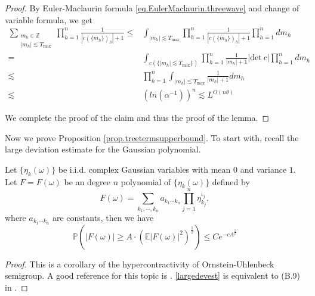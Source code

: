 \begin{proof}
By Euler-Maclaurin formula \eqref{eq.EulerMaclaurin.threewave} and change of variable formula, we get
\begin{equation}
\begin{split}
    \sum_{\substack{m_{h}\in \mathbb{Z}\\ |m_{h}|\lesssim  T_{\text{max}}}} \prod_{h=1}^{n}\frac{1}{|c(\{m_{h}\})_{h}|+1}\le& \int_{|m_{h}|\lesssim  T_{\text{max}}}  \prod_{h=1}^{n}\frac{1}{|c(\{m_{h}\})_{h}|+1}\prod_{h=1}^{n} dm_{h}
    \\
    =& \int_{c(\{|m_{h}|\lesssim  T_{\text{max}}\})}  \prod_{h=1}^{n}\frac{1}{|m_{h}|+1}|\text{det}\ c|\prod_{h=1}^{n}  dm_{h}
    \\
    \lesssim &\prod_{h=1}^{n}\int_{|m_{h}|\lesssim  T_{\text{max}}}  \frac{1}{|m_{h}|+1}  dm_{h}
    \\
    \lesssim & (ln(\alpha^{-1}))^{n}\lesssim L^{O(n\theta)}
\end{split}
\end{equation}

We complete the proof of the claim and thus the proof of the lemma.
\end{proof}

Now we prove Proposition \ref{prop.treetermsupperbound}. To start with, recall the large deviation estimate for the Gaussian polynomial.

\begin{lem}\label{lem.largedev}
Let $\{\eta_k(\omega)\}$ be i.i.d. complex Gaussian variables with mean $0$ and variance $1$. Let $F=F(\omega)$ be an degree $n$ polynomial of $\{\eta_k(\omega)\}$ defined by \begin{equation}\label{indp}
F(\omega)=\sum_{k_1,\cdots,k_n}a_{k_1\cdots k_n}\prod_{j=1}^n\eta_{k_j}^{\iota_j},
\end{equation} 
where $a_{k_1\cdots k_n}$ are constants, then we have 
\begin{equation}\label{largedevest}\mathbb{P}\left(|F(\omega)|\geq A\cdot \left(\mathbb{E}|F(\omega)|^2\right)^{\frac{1}{2}}\right)\leq Ce^{-cA^{\frac{2}{n}}}
\end{equation} 
\end{lem}
\begin{proof} This is a corollary of the hypercontractivity of Ornstein-Uhlenbeck semigroup. A good reference for this topic is \cite{oh2015ornstein}. \eqref{largedevest} is equivalent to (B.9) in \cite{oh2015ornstein}.
\end{proof}

